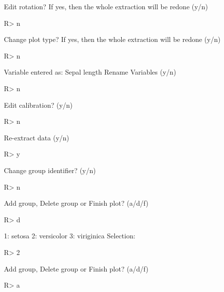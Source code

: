 \documentclass[12pt]{article}
\begin{document}
\begin{CodeChunk}

\begin{CodeOutput}
Edit rotation? If yes, then the whole extraction will be redone (y/n) 
\end{CodeOutput}
\begin{CodeInput}
R> n
\end{CodeInput}
\begin{CodeOutput}
Change plot type? If yes, then the whole extraction will be redone (y/n) 
\end{CodeOutput}
\begin{CodeInput}
R> n
\end{CodeInput}
\begin{CodeOutput}
Variable entered as: 
Sepal length
Rename Variables (y/n) 
\end{CodeOutput}
\begin{CodeInput}
R> n
\end{CodeInput}
\begin{CodeOutput}
Edit calibration? (y/n) 
\end{CodeOutput}
\begin{CodeInput}
R> n
\end{CodeInput}
\begin{CodeOutput}
Re-extract data (y/n) 
\end{CodeOutput}
\begin{CodeInput}
R> y
\end{CodeInput}
\begin{CodeOutput}
Change group identifier? (y/n) 
\end{CodeOutput}
\begin{CodeInput}
R> n
\end{CodeInput}
\begin{CodeOutput}
Add group, Delete group or Finish plot? (a/d/f) 
\end{CodeOutput}
\begin{CodeInput}
R> d
\end{CodeInput}
\begin{CodeOutput}
1: setosa
2: versicolor
3: viriginica
Selection: 
\end{CodeOutput}
\begin{CodeInput}
R> 2
\end{CodeInput}
\begin{CodeOutput}
Add group, Delete group or Finish plot? (a/d/f) 
\end{CodeOutput}
\begin{CodeInput}
R> a
\end{CodeInput}

\end{CodeChunk}
\end{document}
